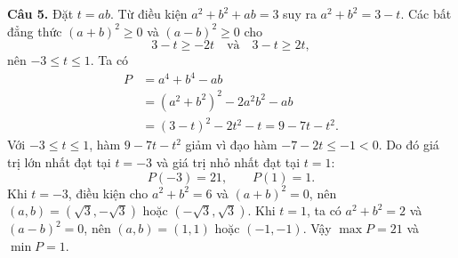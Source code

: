 \documentclass[12pt,a4paper]{article}
\begin{document}
\textbf{Câu 5.} Đặt $t=ab$. Từ điều kiện $a^2+b^2+ab=3$ suy ra $a^2+b^2=3-t$. Các bất đẳng thức $(a+b)^2\ge0$ và $(a-b)^2\ge0$ cho
\[
3-t\ge-2t\quad\text{và}\quad 3-t\ge2t,
\]
nên $-3\le t\le1$. Ta có
\begin{align*}
P&=a^4+b^4-ab\\
 &=(a^2+b^2)^2-2a^2b^2-ab\\
 &=(3-t)^2-2t^2-t=9-7t-t^2.
\end{align*}
Với $-3\le t\le1$, hàm $9-7t-t^2$ giảm vì đạo hàm $-7-2t\le-1<0$. Do đó giá trị lớn nhất đạt tại $t=-3$ và giá trị nhỏ nhất đạt tại $t=1$:
\[
P(-3)=21,\qquad P(1)=1.
\]
Khi $t=-3$, điều kiện cho $a^2+b^2=6$ và $(a+b)^2=0$, nên $(a,b)=(\sqrt3,-\sqrt3)$ hoặc $(-\sqrt3,\sqrt3)$. Khi $t=1$, ta có $a^2+b^2=2$ và $(a-b)^2=0$, nên $(a,b)=(1,1)$ hoặc $(-1,-1)$. Vậy $\max P=21$ và $\min P=1$.
\end{document}
